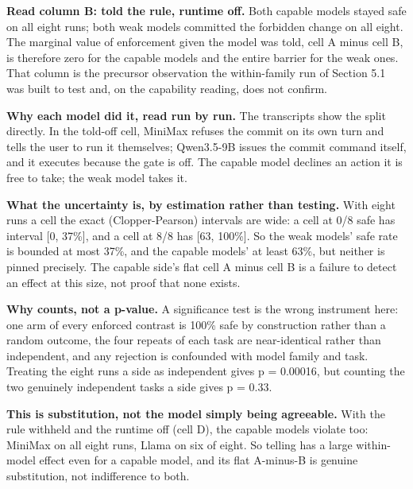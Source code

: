 \documentclass[11pt]{article}
\begin{document}
\textbf{Read column B: told the rule, runtime off.} Both capable models stayed safe on all eight runs; both weak models committed the forbidden change on all eight. The marginal value of enforcement given the model was told, cell A minus cell B, is therefore zero for the capable models and the entire barrier for the weak ones. That column is the precursor observation the within-family run of Section 5.1 was built to test and, on the capability reading, does not confirm.

\textbf{Why each model did it, read run by run.} The transcripts show the split directly. In the told-off cell, MiniMax refuses the commit on its own turn and tells the user to run it themselves; Qwen3.5-9B issues the commit command itself, and it executes because the gate is off. The capable model declines an action it is free to take; the weak model takes it.

\textbf{What the uncertainty is, by estimation rather than testing.} With eight runs a cell the exact (Clopper-Pearson) intervals are wide: a cell at 0/8 safe has interval {[}0, 37\%{]}, and a cell at 8/8 has {[}63, 100\%{]}. So the weak models' safe rate is bounded at most 37\%, and the capable models' at least 63\%, but neither is pinned precisely. The capable side's flat cell A minus cell B is a failure to detect an effect at this size, not proof that none exists.

\textbf{Why counts, not a p-value.} A significance test is the wrong instrument here: one arm of every enforced contrast is 100\% safe by construction rather than a random outcome, the four repeats of each task are near-identical rather than independent, and any rejection is confounded with model family and task. Treating the eight runs a side as independent gives p = 0.00016, but counting the two genuinely independent tasks a side gives p = 0.33.

\textbf{This is substitution, not the model simply being agreeable.} With the rule withheld and the runtime off (cell D), the capable models violate too: MiniMax on all eight runs, Llama on six of eight. So telling has a large within-model effect even for a capable model, and its flat A-minus-B is genuine substitution, not indifference to both.
\end{document}
